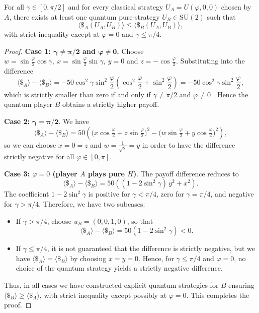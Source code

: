 \documentclass[10pt,a4paper]{amsart}
\newcommand{\SU}{\mathrm{SU}}
\begin{document}
\begin{proposition}
For all $\gamma\in[0,\pi/2]$ and for every classical strategy $U_A=U(\varphi,0,0)$ chosen by $A$, there exists at least one quantum pure-strategy $U_B\in\SU(2)$ such that
\[
\langle \$ _A(U_A,U_B)\rangle \le \langle \$ _B(U_A,U_B)\rangle,
\]
with strict inequality except at $\varphi=0$ and $\gamma\leq\pi/4$.
\end{proposition}

\begin{proof}

\textbf{Case 1: $\mathbf{\gamma\neq\pi/2}$ and $\mathbf{\varphi\neq 0}$.}
Choose $w=\sin\frac{\varphi}{2}\cos\gamma,\ x=\sin\frac{\varphi}{2}\sin\gamma,\ y=0$ and $z=-\cos\frac{\varphi}{2}$. Substituting into the difference
\begin{equation*}
\langle \$ _A \rangle - \langle \$ _B \rangle = -50\cos^2\gamma\sin^2\frac{\varphi}{2}\left(\cos^2\frac{\varphi}{2}+\sin^2\frac{\varphi}{2}\right) = -50\cos^2\gamma\sin^2\frac{\varphi}{2},
\end{equation*}
which is strictly smaller than zero if and only if $\gamma\neq\pi/2$ and $\varphi\neq 0$ .
Hence the quantum player $B$ obtains a strictly higher payoff.

{\textbf{Case 2:}} $\mathbf{\gamma = \pi/2}$.
We have 
\[
\langle \$ _A \rangle - \langle \$ _B \rangle = 50\left( \bigl(x\cos\tfrac{\varphi}{2} + z\sin\tfrac{\varphi}{2}\bigr)^2
- \bigl(w\sin\tfrac{\varphi}{2}+y \cos\tfrac{\varphi}{2}\bigr)^2\right),
\] so we can choose $x=0=z$ and $w=\frac{1}{\sqrt{2}}=y$ in order to have the difference strictly negative for all $\varphi\in[0,\pi]$.

{\textbf{Case 3: $\varphi = 0$ (player $A$ plays pure $H$)}}. The payoff difference reduces to
\[
\langle \$ _A \rangle - \langle \$ _B \rangle = 50\left( (1 - 2\sin^2\gamma)\, y^2 + x^2 \right).
\]
The coefficient $1 - 2\sin^2\gamma$ is positive for $\gamma < \pi/4$, zero for $\gamma = \pi/4$, and negative for $\gamma > \pi/4$.
Therefore, we have two subcases:
\begin{itemize}
  \item If $\gamma > \pi/4$, choose $u_B=(0,0,1,0)$, so that 
  $$\langle \$ _A \rangle - \langle \$ _B \rangle=50(1 - 2\sin^2\gamma)<0.
  $$
  \item If $\gamma \leq \pi/4$, it is not guaranteed that the difference is strictly negative, but we have $\langle \$ _A \rangle = \langle \$ _B \rangle$ by choosing $x = y = 0$. Hence, for $\gamma \le \pi/4$ and $\varphi = 0$, no choice of the quantum strategy yields a strictly negative difference.
\end{itemize}



Thus, in all cases we have constructed explicit quantum strategies for $B$ ensuring $\langle \$ _B \rangle \ge \langle \$ _A \rangle$, with strict inequality except possibly at $\varphi=0$. This completes the proof.
\end{proof}
\end{document}
